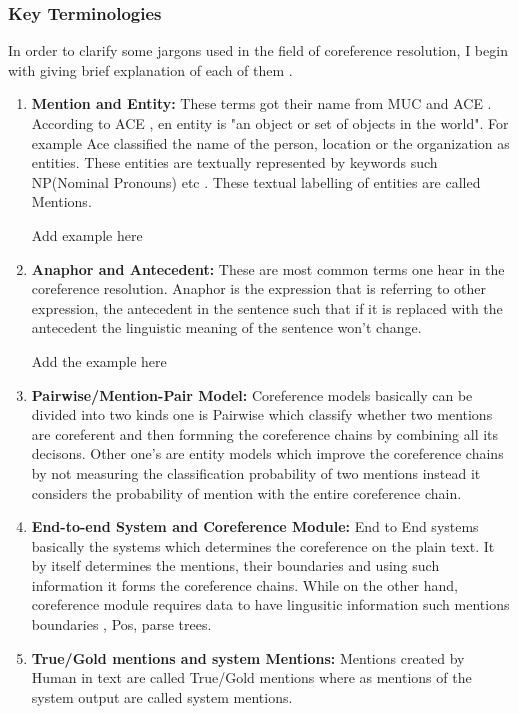 \documentclass[11pt]{article}
\begin{document}
\subsubsection{Key Terminologies}
In order to clarify some jargons used in the field of coreference resolution, I begin with giving brief explanation of each of them .
\begin{enumerate}
  \item \textbf{Mention and Entity:} These terms got their name from MUC and ACE . According to ACE , en entity is "an object or set of objects in the world". For example Ace classified the name of the person, location or the organization as entities. These entities are textually represented by keywords such NP(Nominal Pronouns) etc . These textual labelling of entities are called Mentions.
   
   Add example here
  
  \item \textbf{Anaphor and Antecedent:} These are most common terms one hear in the coreference resolution. Anaphor is the expression that is referring to other expression, the antecedent in the sentence such that if it is replaced with the antecedent the linguistic meaning of the sentence won't change.
  
  Add the example here
  
   

  \item \textbf{Pairwise/Mention-Pair Model:} Coreference models basically can be divided into two kinds one is Pairwise which classify whether two mentions are coreferent and then formning the coreference chains by combining all its decisons. Other one's are entity models which improve the coreference chains by not measuring the classification probability of two mentions instead it considers the probability of mention with the entire coreference chain.
  
  
 \item \textbf{End-to-end System and Coreference Module:} End to End systems basically the systems which determines the coreference on the plain text. It by itself determines the mentions, their boundaries and using such information it forms the coreference chains. While on the other hand, coreference module requires data to have lingusitic information such mentions boundaries , Pos, parse trees.
 
 \item \textbf{True/Gold mentions and system Mentions:} Mentions created by Human in text are called True/Gold mentions where as mentions of the system output are called system mentions.
 
 
 
\end{enumerate}
\end{document}
